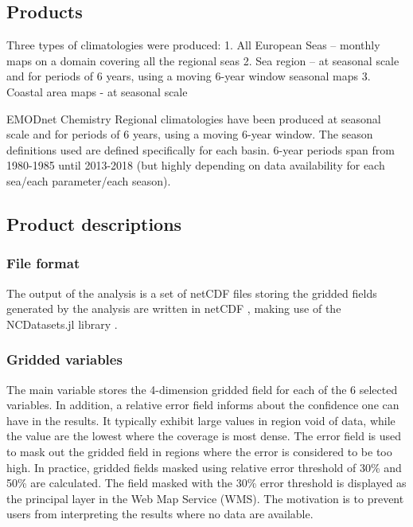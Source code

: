 \documentclass[essd, manuscript]{copernicus}
\begin{document}
\subsection{Products}

Three types of climatologies were produced:
1. All European Seas – monthly maps on a domain covering all the regional seas
2. Sea region – at seasonal scale and for periods of 6 years, using a moving 6-year window
seasonal maps
3. Coastal area maps - at seasonal scale

EMODnet Chemistry Regional climatologies have been produced at seasonal scale and for periods of 6 years,
using a moving 6-year window. The season definitions used are defined specifically for each basin. 6-year
periods span from 1980-1985 until 2013-2018 (but highly depending on data availability for each sea/each
parameter/each season). 

\subsection{Product descriptions}

\subsubsection{File format}

The output of the analysis is a set of netCDF files storing the gridded fields generated by the analysis are written in netCDF \citep{Rew1990,Brown1993}, making use of the NCDatasets.jl library \citep{Barth2024}.

\subsubsection{Gridded variables}

The main variable stores the 4-dimension gridded field for each of the 6 selected variables. In addition, a relative error field informs about the confidence one can have in the results. It typically exhibit large values in region void of data, while the value are the lowest where the coverage is most dense. The error field is used to mask out the gridded field in regions where the error is considered to be too high. In practice, gridded fields masked using relative error threshold of 30\% and 50\% are calculated. The field masked with the 30\% error threshold is displayed as the principal layer in the Web Map Service (WMS). The motivation is to prevent users from interpreting the results where no data are available. 
\end{document}
